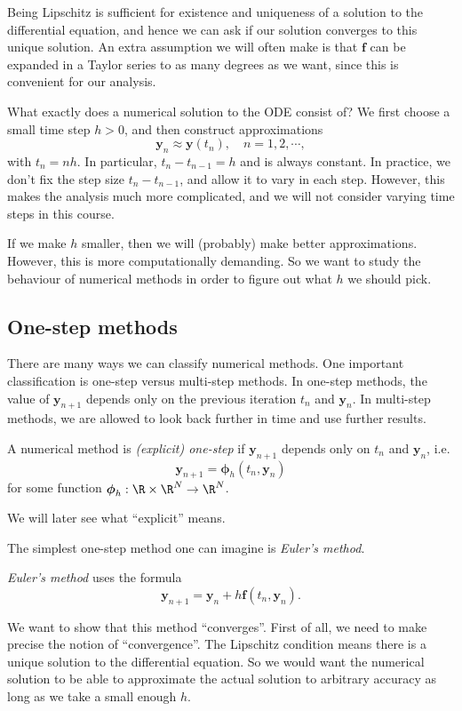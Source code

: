 \documentclass[a4paper]{article}
\begin{document}
Being Lipschitz is sufficient for existence and uniqueness of a solution to the differential equation, and hence we can ask if our solution converges to this unique solution. An extra assumption we will often make is that $\mathbf{f}$ can be expanded in a Taylor series to as many degrees as we want, since this is convenient for our analysis.

What exactly does a numerical solution to the ODE consist of? We first choose a small time step $h > 0$, and then construct approximations
\[
  \mathbf{y}_n \approx \mathbf{y}(t_n),\quad n = 1, 2, \cdots,
\]
with $t_n = nh$. In particular, $t_n - t_{n - 1} = h$ and is always constant. In practice, we don't fix the step size $t_n - t_{n - 1}$, and allow it to vary in each step. However, this makes the analysis much more complicated, and we will not consider varying time steps in this course.

If we make $h$ smaller, then we will (probably) make better approximations. However, this is more computationally demanding. So we want to study the behaviour of numerical methods in order to figure out what $h$ we should pick.

\subsection{One-step methods}
There are many ways we can classify numerical methods. One important classification is one-step versus multi-step methods. In one-step methods, the value of $\mathbf{y}_{n + 1}$ depends only on the previous iteration $t_n$ and $\mathbf{y}_n$. In multi-step methods, we are allowed to look back further in time and use further results.

\begin{defi}
  A numerical method is \emph{(explicit) one-step} if $\mathbf{y}_{n + 1}$ depends only on $t_n$ and $\mathbf{y}_n$, i.e.
  \[
    \mathbf{y}_{n + 1} = \boldsymbol\phi_h(t_n, \mathbf{y}_n)
  \]
  for some function $\boldsymbol\phi_h: \R \times \R^N \to \R^N$.
\end{defi}
We will later see what ``explicit'' means.

The simplest one-step method one can imagine is \emph{Euler's method}.
\begin{defi}
  \emph{Euler's method} uses the formula
  \[
    \mathbf{y}_{n + 1} = \mathbf{y}_n + h\mathbf{f}(t_n, \mathbf{y}_n).
  \]
\end{defi}
We want to show that this method ``converges''. First of all, we need to make precise the notion of ``convergence''. The Lipschitz condition means there is a unique solution to the differential equation. So we would want the numerical solution to be able to approximate the actual solution to arbitrary accuracy as long as we take a small enough $h$.
\end{document}
